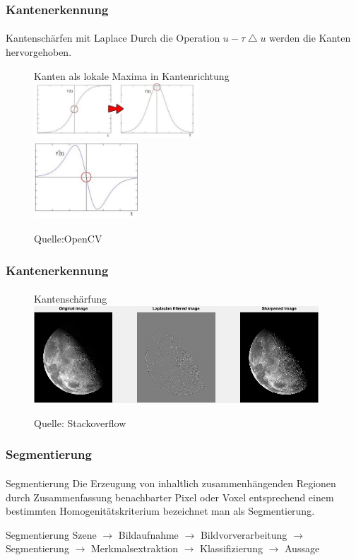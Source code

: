 \documentclass{beamer}
\begin{document}
\begin{frame}
    \frametitle{Kantenerkennung}
\framesubtitle{}
\begin{block}{Kantenschärfen mit Laplace}
Durch die Operation $u - \tau \bigtriangleup u$ werden die Kanten hervorgehoben.
\end{block}
\begin{figure}[htp]
      \centering
Kanten als lokale Maxima in Kantenrichtung \\
    \includegraphics[width=0.55\textwidth]{img/laplace1} \\
    \includegraphics[width=0.35\textwidth]{img/laplace2} 
      \caption{Quelle:OpenCV}
\end{figure}
 \end{frame}

\begin{frame}
    \frametitle{Kantenerkennung}
\framesubtitle{}
\begin{figure}[htp]
      \centering
Kantenschärfung \\
    \includegraphics[width=0.95\textwidth]{img/sharpening} 
      \caption{Quelle: Stackoverflow}
\end{figure}
 \end{frame}



\begin{frame}
    \frametitle{Segmentierung}
\framesubtitle{}
\begin{block}{Segmentierung}
 Die Erzeugung von inhaltlich zusammenhängenden Regionen durch Zusammenfassung benachbarter Pixel oder Voxel entsprechend einem bestimmten Homogenitätskriterium bezeichnet man als Segmentierung. 
\end{block}
\begin{block}{Segmentierung}
Szene $\to$ Bildaufnahme  $\to$ Bildvorverarbeitung  $\to$ Segmentierung  $\to$ Merkmalsextraktion  $\to$ Klassifizierung  $\to$ Aussage 
\end{block}
 
\end{frame}
\end{document}
